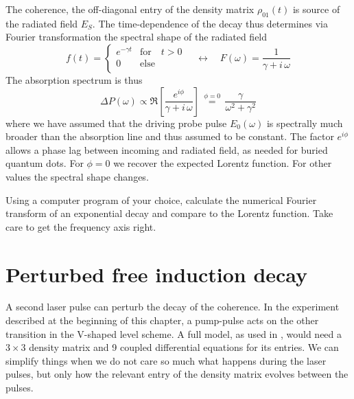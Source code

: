 The coherence, the off-diagonal entry of the density matrix $\rho_{01}(t)$ is source of the radiated field $E_S$. The time-dependence of the decay thus determines via Fourier transformation the spectral shape of the radiated field
\begin{equation}
 f(t) = \left\{ \begin{array}{ll}
e^{- \gamma t } & \text{for} \quad t > 0 \\
 0 & \text{else} \\
 \end{array}
 \right.
 \quad 
 \leftrightarrow \quad
  F(\omega) = \frac{1}{\gamma + i \, \omega}
\end{equation}
The absorption spectrum is thus
\begin{equation}
\Delta P (\omega)  \propto \Re \left[  \frac{e^{i \phi}}{\gamma + i \, \omega}       \right] \, \overset{\phi = 0}{=} \, \frac{\gamma}{\omega^2 + \gamma^2}
\end{equation}
where we have assumed that the driving probe pulse $E_0(\omega)$ is spectrally much broader than the absorption line and thus assumed to be constant. The factor $e^{i \phi}$ allows a phase lag between incoming and radiated field, as needed for buried quantum dots. For $\phi = 0$ we recover the expected Lorentz function. For other values the spectral shape changes.

\begin{questions}

\item Using a computer program of your choice, calculate  the numerical Fourier transform of an exponential decay and compare to the Lorentz function. Take care to get the frequency axis right.

\end{questions}
 
 
 
\section{Perturbed free induction decay}

A second laser pulse can perturb the decay of the coherence. In the experiment described at the beginning of this chapter, a pump-pulse acts on the other transition in the V-shaped level scheme. A full model, as used in \citep{Wolpert:2012hs}, would need a $3 \times 3$ density matrix and 9 coupled differential equations for its entries. We can simplify things when we do not care so much what happens during the laser pulses, but only how the relevant entry of the density matrix evolves between the pulses.


